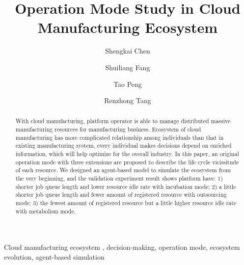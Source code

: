 
\title{Operation Mode Study in Cloud Manufacturing Ecosystem
}

\author[add1]{Shengkai Chen}
\author[add2,add1]{Shuiliang Fang}
\author[add1]{Tao Peng}
\author[add1]{Renzhong Tang}
\address[add2]{The State Key Laboratory of Fluid Power Transmission and Control, College of Mechanical Engineering, Zhejiang University, Hangzhou, 310027, China}
\address[add1]{Key Laboratory of Advanced Manufacturing Technology of Zhejiang Province, College of Mechanical Engineering, Zhejiang University, Hangzhou , 310027, China}



\begin{abstract}
With cloud manufacturing, platform operator is able to manage distributed massive manufacturing resources for manufacturing business.
Ecosystem of cloud manufacturing has more complicated relationship among individuals than that in existing manufacturing system, every individual makes decisions depend on enriched information, which will help optimize for the overall industry. In this paper, an original operation mode with three extensions are proposed to describe the life cycle vicissitude of each resource. We designed an agent-based model to simulate the ecosystem from the very beginning, and the validation experiment result shows platform have: 1) shorter job queue length and lower resource idle rate with incubation mode; 2) a little shorter job queue length and fewer amount of registered resource with outsourcing mode; 3) the fewest amount of registered resource but a little higher resource idle rate with metabolism mode.


\end{abstract}

\begin{keyword}
Cloud manufacturing ecosystem \sep
decision-making\sep
operation mode\sep
ecosystem evolution\sep
agent-based simulation

\end{keyword}
